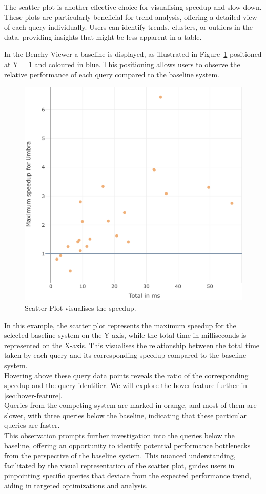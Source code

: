 The scatter plot is another effective choice for visualising speedup and slow-down. These plots are particularly beneficial for trend analysis, offering a detailed view of each query individually. Users can identify trends, clusters, or outliers in the data, providing insights that might be less apparent in a table.

In the Benchy Viewer a baseline is displayed, as illustrated in Figure~\ref{fig:scatter} positioned at Y = 1 and coloured in blue. This positioning allows users to observe the relative performance of each query compared to the baseline system.

\begin{figure}[h]
  \centering
  \includegraphics[width=0.7\linewidth]{figures/bsp-scatter.png}
  \caption{Scatter Plot visualises the speedup.}
  \label{fig:scatter}
\end{figure}

In this example, the scatter plot represents the maximum speedup for the selected baseline system on the Y-axis, while the total time in milliseconds is represented on the X-axis. This visualises the relationship between the total time taken by each query and its corresponding speedup compared to the baseline system.\\
Hovering above these query data points reveals the ratio of the corresponding speedup and the query identifier. We will explore the hover feature further in \ref{sec:hover-feature}.\\
Queries from the competing system are marked in orange, and most of them are slower, with three queries below the baseline, indicating that these particular queries are faster.\\
This observation prompts further investigation into the queries below the baseline, offering an opportunity to identify potential performance bottlenecks from the perspective of the baseline system. This nuanced understanding, facilitated by the visual representation of the scatter plot, guides users in pinpointing specific queries that deviate from the expected performance trend, aiding in targeted optimizations and analysis.

